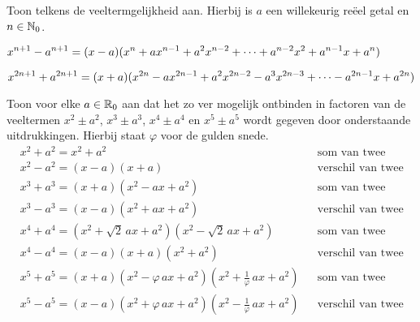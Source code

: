 \documentclass{ximera}
\begin{document}
\begin{Uitbreiding}
\begin{exercise}
Toon telkens de veeltermgelijkheid aan. Hierbij is $a$ een willekeurig reëel getal en $n \in \mathbb{N}_0$.

\begin{question}
	$\displaystyle x^{n+1} - a^{n+1} = (x-a)(x^{n} + ax^{n-1} + a^2x^{n-2} + \dots + a^{n-2}x^2 + a^{n-1}x + a^{n})$
\end{question}
\begin{question}
	$\displaystyle x^{2n+1} + a^{2n+1} = (x+a)(x^{2n} - ax^{2n-1} + a^2x^{2n-2} - a^3x^{2n-3} + \dots - a^{2n-1}x + a^{2n})$
\end{question}
\end{exercise}

\begin{exercise}
\label{somtweevierdemachten}
Toon voor elke $a \in \mathbb{R}_0$ aan dat het zo ver mogelijk ontbinden in factoren van de veeltermen $x^2 \pm a^2$, $x^3 \pm a^3$, $x^4 \pm a^4$ en  $x^5 \pm a^5$ wordt gegeven door onderstaande uitdrukkingen. Hierbij staat $\varphi$ voor de gulden snede. %
\begin{align*}
& x^2 + a^2 = x^2 + a^2 && \text{som van twee kwadraten} \\
& x^2 - a^2 = (x-a)(x+a) && \text{verschil van twee kwadraten} \\
& x^3 + a^3 = (x+a)(x^2 - ax + a^2) && \text{som van twee derde machten} \\
& x^3 - a^3 = (x-a)(x^2 + ax + a^2) && \text{verschil van twee derde machten} \\
& x^4 + a^4 = (x^2 + \sqrt{2}\,ax + a^2)(x^2 - \sqrt{2}\,ax + a^2) && \text{som van twee vierde machten} \\
& x^4 - a^4 = (x-a)(x+a)(x^2+a^2) && \text{verschil van twee vierde machten} \\
& x^5 + a^5 = (x+a)(x^2-\varphi\,ax + a^2)(x^2+\frac{1}{\varphi}\,ax + a^2) && \text{som van twee vijfde machten} \\
& x^5 - a^5 = (x-a)(x^2+\varphi\,ax + a^2)(x^2-\frac{1}{\varphi}\,ax + a^2) && \text{verschil van twee vijfde machten}
\end{align*}
\end{exercise}


\end{Uitbreiding}
\end{document}

